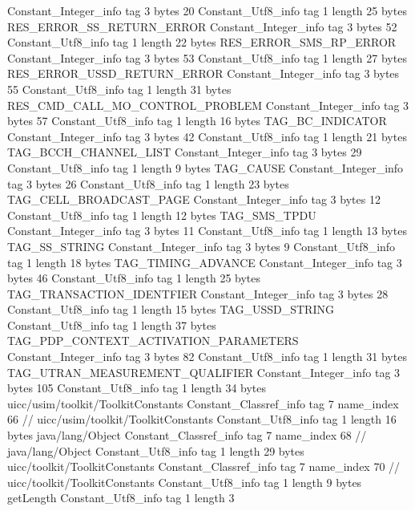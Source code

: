 {{{		}
		Constant_Integer_info {
			tag	3
			bytes	20
		}
		Constant_Utf8_info {
			tag	1
			length	25
			bytes	RES_ERROR_SS_RETURN_ERROR
		}
		Constant_Integer_info {
			tag	3
			bytes	52
		}
		Constant_Utf8_info {
			tag	1
			length	22
			bytes	RES_ERROR_SMS_RP_ERROR
		}
		Constant_Integer_info {
			tag	3
			bytes	53
		}
		Constant_Utf8_info {
			tag	1
			length	27
			bytes	RES_ERROR_USSD_RETURN_ERROR
		}
		Constant_Integer_info {
			tag	3
			bytes	55
		}
		Constant_Utf8_info {
			tag	1
			length	31
			bytes	RES_CMD_CALL_MO_CONTROL_PROBLEM
		}
		Constant_Integer_info {
			tag	3
			bytes	57
		}
		Constant_Utf8_info {
			tag	1
			length	16
			bytes	TAG_BC_INDICATOR
		}
		Constant_Integer_info {
			tag	3
			bytes	42
		}
		Constant_Utf8_info {
			tag	1
			length	21
			bytes	TAG_BCCH_CHANNEL_LIST
		}
		Constant_Integer_info {
			tag	3
			bytes	29
		}
		Constant_Utf8_info {
			tag	1
			length	9
			bytes	TAG_CAUSE
		}
		Constant_Integer_info {
			tag	3
			bytes	26
		}
		Constant_Utf8_info {
			tag	1
			length	23
			bytes	TAG_CELL_BROADCAST_PAGE
		}
		Constant_Integer_info {
			tag	3
			bytes	12
		}
		Constant_Utf8_info {
			tag	1
			length	12
			bytes	TAG_SMS_TPDU
		}
		Constant_Integer_info {
			tag	3
			bytes	11
		}
		Constant_Utf8_info {
			tag	1
			length	13
			bytes	TAG_SS_STRING
		}
		Constant_Integer_info {
			tag	3
			bytes	9
		}
		Constant_Utf8_info {
			tag	1
			length	18
			bytes	TAG_TIMING_ADVANCE
		}
		Constant_Integer_info {
			tag	3
			bytes	46
		}
		Constant_Utf8_info {
			tag	1
			length	25
			bytes	TAG_TRANSACTION_IDENTFIER
		}
		Constant_Integer_info {
			tag	3
			bytes	28
		}
		Constant_Utf8_info {
			tag	1
			length	15
			bytes	TAG_USSD_STRING
		}
		Constant_Utf8_info {
			tag	1
			length	37
			bytes	TAG_PDP_CONTEXT_ACTIVATION_PARAMETERS
		}
		Constant_Integer_info {
			tag	3
			bytes	82
		}
		Constant_Utf8_info {
			tag	1
			length	31
			bytes	TAG_UTRAN_MEASUREMENT_QUALIFIER
		}
		Constant_Integer_info {
			tag	3
			bytes	105
		}
		Constant_Utf8_info {
			tag	1
			length	34
			bytes	uicc/usim/toolkit/ToolkitConstants
		}
		Constant_Classref_info {
			tag	7
			name_index	66		// uicc/usim/toolkit/ToolkitConstants
		}
		Constant_Utf8_info {
			tag	1
			length	16
			bytes	java/lang/Object
		}
		Constant_Classref_info {
			tag	7
			name_index	68		// java/lang/Object
		}
		Constant_Utf8_info {
			tag	1
			length	29
			bytes	uicc/toolkit/ToolkitConstants
		}
		Constant_Classref_info {
			tag	7
			name_index	70		// uicc/toolkit/ToolkitConstants
		}
		Constant_Utf8_info {
			tag	1
			length	9
			bytes	getLength
		}
		Constant_Utf8_info {
			tag	1
			length	3
}}}
